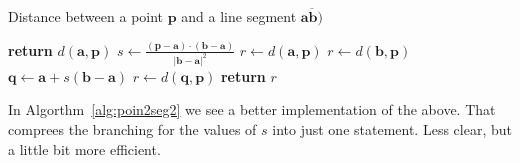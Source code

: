 {\centering
\begin{minipage}{\linewidth}
  \begin{algorithm}[H]
    \caption{Distance between a point $\mathbf{p}$ and a line segment $\overline{\mathbf{a}\mathbf{b})}$}
    \label{alg:poin2seg}
    \begin{algorithmic}[1] %
       
         
          \State \textbf{return} $d(\mathbf{a},\mathbf{p})$
        \EndIf
        \State $s \gets \frac{(\mathbf{p} - \mathbf{a}) \cdot (\mathbf{b} - \mathbf{a})}{|\mathbf{b} - \mathbf{a}|^2}$ 
         
          \State $r \gets d(\mathbf{a},\mathbf{p})$
          
          \State $r \gets d(\mathbf{b},\mathbf{p})$
        \Else {}
          \State $\mathbf{q} \gets \mathbf{a} + s (\mathbf{b} - \mathbf{a})$ 
          \State $r \gets d(\mathbf{q},\mathbf{p})$
        \EndIf
        \State \textbf{return} $r$ 
      \EndProcedure
    \end{algorithmic}
  \end{algorithm}
\end{minipage}
\par
}

In Algorthm~\ref{alg:poin2seg2} we see a better implementation of the above. That comprees the branching for the values of $s$ into just one statement. Less clear, but a little bit more efficient.

